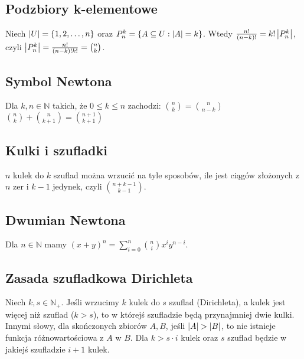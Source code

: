 \subsection*{Podzbiory k-elementowe}
Niech $\left| U \right| = \{ 1, 2, \ldots, n \}$ oraz $P_n^k = {\{ A \subseteq U : \left| A \right| = k \}}$.
Wtedy ${\frac{n!}{(n - k)!}} = {k! \left| P_n^k \right|}$, czyli 
$\left| P_n^k \right| = \frac{n!}{(n - k)! k!} = \binom{n}{k}$.

\subsection*{Symbol Newtona}
Dla $k, n \in \mathbb{N}$ takich, że $0 \leq k \leq n$ zachodzi:
$\binom{n}{k} = \binom{n}{n-k}$ \\
$\binom{n}{k} + \binom{n}{k+1} = \binom{n+1}{k+1}$

\subsection*{Kulki i szufladki}
$n$ kulek do $k$ szuflad można wrzucić na tyle sposobów, ile jest ciągów złożonych
z $n$ zer i $k-1$ jedynek, czyli $\binom{n+k-1}{k-1}$.

\subsection*{Dwumian Newtona}
Dla $n \in \mathbb{N}$ mamy 
$(x+y)^n = \sum\limits_{i=0}^{n} \binom{n}{i} x^i y^{n-i}$.

\subsection*{Zasada szufladkowa Dirichleta}
Niech $k, s \in \mathbb{N}_+$. Jeśli wrzucimy $k$ kulek do $s$ szuflad (Dirichleta),
a kulek jest więcej niż szuflad ($k > s$), to w którejś szufladzie będą przynajmniej
dwie kulki. Innymi słowy, dla skończonych zbiorów $A, B$, jeśli $\left| A \right| > \left| B \right|$,
to nie istnieje funkcja różnowartościowa z $A$ w $B$. Dla $k > s\cdot i$ kulek oraz
$s$ szuflad będzie w jakiejś szufladzie $i + 1$ kulek.